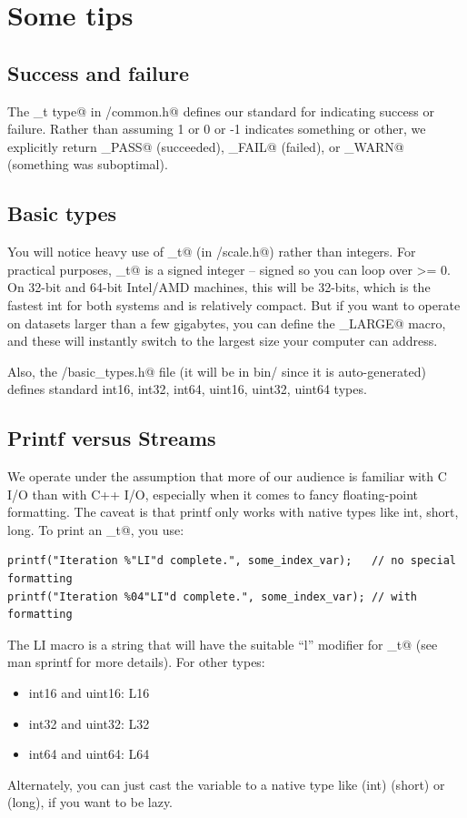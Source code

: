 \documentclass[letter]{report}
\begin{document}
\section{Some tips}

\subsection{Success and failure}

The \verb@success_t type@ in \verb@base/common.h@ defines our standard for indicating success or failure. Rather than assuming 1 or 0 or -1 indicates something or other, we explicitly return \verb@SUCCESS_PASS@ (succeeded), \verb@SUCCESS_FAIL@ (failed), or \verb@SUCCESS_WARN@ (something was suboptimal).

\subsection{Basic types}

You will notice heavy use of \verb@index_t@ (in \verb@base/scale.h@) rather than integers. For practical purposes, \verb@index_t@ is a signed integer -- signed so you can loop over >= 0. On 32-bit and 64-bit Intel/AMD machines, this will be 32-bits, which is the fastest int for both systems and is relatively compact. But if you want to operate on datasets larger than a few gigabytes, you can define the \verb@SCALE_LARGE@ macro, and these will instantly switch to the largest size your computer can address.

Also, the \verb@base/basic_types.h@ file (it will be in bin/ since it is auto-generated) defines standard int16, int32, int64, uint16, uint32, uint64 types.

\subsection{Printf versus Streams}

We operate under the assumption that more of our audience is familiar with C I/O than with C++ I/O, especially when it comes to fancy floating-point formatting. The caveat is that printf only works with native types like int, short, long. To print an \verb@index_t@, you use:
\begin{verbatim}
printf("Iteration %"LI"d complete.", some_index_var);   // no special formatting
printf("Iteration %04"LI"d complete.", some_index_var); // with formatting
\end{verbatim}
The LI macro is a string that will have the suitable ``l'' modifier for \verb@index_t@ (see man sprintf for more details). For other types:
\begin {itemize}
\item int16 and uint16: L16
\item int32 and uint32: L32
\item int64 and uint64: L64 
\end{itemize}
Alternately, you can just cast the variable to a native type like (int) (short) or (long), if you want to be lazy.
\end{document}
